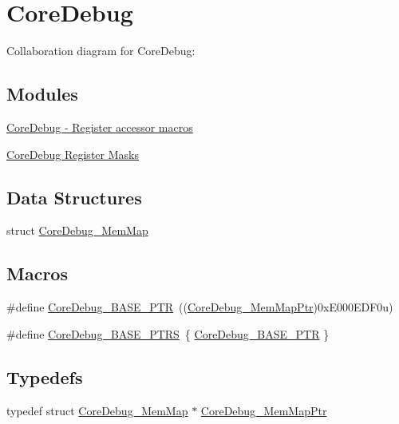 \hypertarget{group___core_debug___peripheral}{}\section{Core\+Debug}
\label{group___core_debug___peripheral}
Collaboration diagram for Core\+Debug\+:
\subsection*{Modules}
\begin{DoxyCompactItemize}
\item 
\hyperlink{group___core_debug___register___accessor___macros}{Core\+Debug -\/ Register accessor macros}
\item 
\hyperlink{group___core_debug___register___masks}{Core\+Debug Register Masks}
\end{DoxyCompactItemize}
\subsection*{Data Structures}
\begin{DoxyCompactItemize}
\item 
struct \hyperlink{struct_core_debug___mem_map}{Core\+Debug\+\_\+\+Mem\+Map}
\end{DoxyCompactItemize}
\subsection*{Macros}
\begin{DoxyCompactItemize}
\item 
\#define \hyperlink{group___core_debug___peripheral_ga994a185afca30ede538d89322c4f0326}{Core\+Debug\+\_\+\+B\+A\+S\+E\+\_\+\+P\+TR}~((\hyperlink{group___core_debug___peripheral_gaa548220bc91b12bd49065fe752579fcd}{Core\+Debug\+\_\+\+Mem\+Map\+Ptr})0x\+E000\+E\+D\+F0u)
\item 
\#define \hyperlink{group___core_debug___peripheral_gaceec19d257d8b9f9bff5d47d285dec27}{Core\+Debug\+\_\+\+B\+A\+S\+E\+\_\+\+P\+T\+RS}~\{ \hyperlink{group___core_debug___peripheral_ga994a185afca30ede538d89322c4f0326}{Core\+Debug\+\_\+\+B\+A\+S\+E\+\_\+\+P\+TR} \}
\end{DoxyCompactItemize}
\subsection*{Typedefs}
\begin{DoxyCompactItemize}
\item 
typedef struct \hyperlink{struct_core_debug___mem_map}{Core\+Debug\+\_\+\+Mem\+Map} $\ast$ \hyperlink{group___core_debug___peripheral_gaa548220bc91b12bd49065fe752579fcd}{Core\+Debug\+\_\+\+Mem\+Map\+Ptr}
\end{DoxyCompactItemize}


